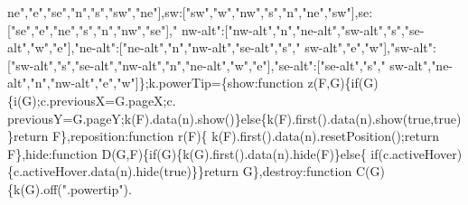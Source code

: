 \begin{DoxyCode}
{{      ne"},\textcolor{stringliteral}{"e"},\textcolor{stringliteral}{"se"},\textcolor{stringliteral}{"n"},\textcolor{stringliteral}{"s"},\textcolor{stringliteral}{"sw"},\textcolor{stringliteral}{"ne"}],sw:[\textcolor{stringliteral}{"sw"},\textcolor{stringliteral}{"w"},\textcolor{stringliteral}{"nw"},\textcolor{stringliteral}{"s"},\textcolor{stringliteral}{"n"},\textcolor{stringliteral}{"ne"},\textcolor{stringliteral}{"sw"}],se:[\textcolor{stringliteral}{"se"},\textcolor{stringliteral}{"e"},\textcolor{stringliteral}{"ne"},\textcolor{stringliteral}{"s"},\textcolor{stringliteral}{"n"},\textcolor{stringliteral}{"nw"},\textcolor{stringliteral}{"se"}],\textcolor{stringliteral}{"
      nw-alt"}:[\textcolor{stringliteral}{"nw-alt"},\textcolor{stringliteral}{"n"},\textcolor{stringliteral}{"ne-alt"},\textcolor{stringliteral}{"sw-alt"},\textcolor{stringliteral}{"s"},\textcolor{stringliteral}{"se-alt"},\textcolor{stringliteral}{"w"},\textcolor{stringliteral}{"e"}],\textcolor{stringliteral}{"ne-alt"}:[\textcolor{stringliteral}{"ne-alt"},\textcolor{stringliteral}{"n"},\textcolor{stringliteral}{"nw-alt"},\textcolor{stringliteral}{"se-alt"},\textcolor{stringliteral}{"s"},\textcolor{stringliteral}{"
      sw-alt"},\textcolor{stringliteral}{"e"},\textcolor{stringliteral}{"w"}],\textcolor{stringliteral}{"sw-alt"}:[\textcolor{stringliteral}{"sw-alt"},\textcolor{stringliteral}{"s"},\textcolor{stringliteral}{"se-alt"},\textcolor{stringliteral}{"nw-alt"},\textcolor{stringliteral}{"n"},\textcolor{stringliteral}{"ne-alt"},\textcolor{stringliteral}{"w"},\textcolor{stringliteral}{"e"}],\textcolor{stringliteral}{"se-alt"}:[\textcolor{stringliteral}{"se-alt"},\textcolor{stringliteral}{"s"},\textcolor{stringliteral}{"
      sw-alt"},\textcolor{stringliteral}{"ne-alt"},\textcolor{stringliteral}{"n"},\textcolor{stringliteral}{"nw-alt"},\textcolor{stringliteral}{"e"},\textcolor{stringliteral}{"w"}]\};k.powerTip=\{show:\textcolor{keyword}{function} z(F,G)\{\textcolor{keywordflow}{if}(G)\{i(G);c.previousX=G.pageX;c.
      previousY=G.pageY;k(F).data(n).show()\}\textcolor{keywordflow}{else}\{k(F).first().data(n).show(\textcolor{keyword}{true},\textcolor{keyword}{true})\}\textcolor{keywordflow}{return} F\},reposition:\textcolor{keyword}{function} r(F)\{
      k(F).first().data(n).resetPosition();\textcolor{keywordflow}{return} F\},hide:\textcolor{keyword}{function} D(G,F)\{\textcolor{keywordflow}{if}(G)\{k(G).first().data(n).hide(F)\}\textcolor{keywordflow}{else}\{\textcolor{keywordflow}{
      if}(c.activeHover)\{c.activeHover.data(n).hide(\textcolor{keyword}{true})\}\}\textcolor{keywordflow}{return} G\},destroy:\textcolor{keyword}{function} C(G)\{k(G).off(\textcolor{stringliteral}{".powertip"}).
}
\end{DoxyCode}
